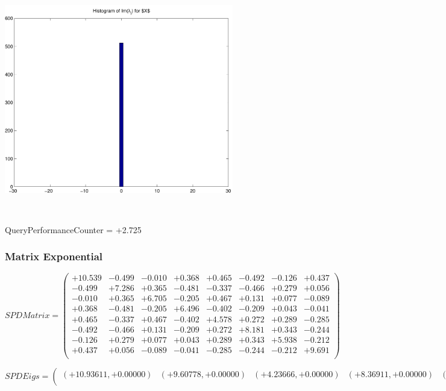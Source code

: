 \documentclass[9pt]{article}
\theoremstyle{plain}
\theoremstyle{definition}
\theoremstyle{remark}
\numberwithin{equation}{section}
\begin{document}
\includegraphics[width=10.0cm,height=10.0cm]{Im_lambda_n.pdf}

QueryPerformanceCounter  =  +2.725
\subsubsection{Matrix Exponential }
$SPD Matrix = \left(
\begin{array}{
cccccccc}
+10.539 & -0.499 & -0.010 & +0.368 & +0.465 & -0.492 & -0.126 & +0.437 \\
-0.499 & +7.286 & +0.365 & -0.481 & -0.337 & -0.466 & +0.279 & +0.056 \\
-0.010 & +0.365 & +6.705 & -0.205 & +0.467 & +0.131 & +0.077 & -0.089 \\
+0.368 & -0.481 & -0.205 & +6.496 & -0.402 & -0.209 & +0.043 & -0.041 \\
+0.465 & -0.337 & +0.467 & -0.402 & +4.578 & +0.272 & +0.289 & -0.285 \\
-0.492 & -0.466 & +0.131 & -0.209 & +0.272 & +8.181 & +0.343 & -0.244 \\
-0.126 & +0.279 & +0.077 & +0.043 & +0.289 & +0.343 & +5.938 & -0.212 \\
+0.437 & +0.056 & -0.089 & -0.041 & -0.285 & -0.244 & -0.212 & +9.691 \\
\end{array}
\right)$ \newline 

$SPD Eigs = \left(
\begin{array}{
cccccccc}
(+10.93611,+0.00000) & (+9.60778,+0.00000) & (+4.23666,+0.00000) & (+8.36911,+0.00000) & (+7.56229,+0.00000) & (+5.82791,+0.00000) & (+6.54198,+0.00000) & (+6.33139,+0.00000) \\
\end{array}
\right)$ \newline 
\end{document}
